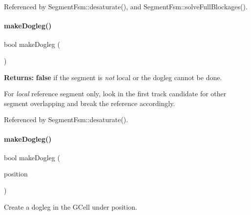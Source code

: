 Referenced by Segment\+Fsm\+::desaturate(), and Segment\+Fsm\+::solve\+Full\+Blockages().

\mbox{\label{classKite_1_1Manipulator_af4d93a43ea18ae124da71072c66d1e0a}} 
\paragraph{\texorpdfstring{make\+Dogleg()}{makeDogleg()}\hspace{0.1cm}{\footnotesize\ttfamily [1/3]}}
{\footnotesize\ttfamily bool make\+Dogleg (\begin{DoxyParamCaption}{ }\end{DoxyParamCaption})}

{\bfseries Returns\+:} {\bfseries false} if the segment is {\itshape not} local or the dogleg cannot be done.

For {\itshape local} reference segment only, look in the first track candidate for other segment overlapping and break the reference accordingly. 

Referenced by Segment\+Fsm\+::desaturate().

\mbox{\label{classKite_1_1Manipulator_a97e56b831481ef65309f6e3b7e3f4f3d}} 
\paragraph{\texorpdfstring{make\+Dogleg()}{makeDogleg()}\hspace{0.1cm}{\footnotesize\ttfamily [2/3]}}
{\footnotesize\ttfamily bool make\+Dogleg (\begin{DoxyParamCaption}\item[{\textbf{ Db\+U\+::\+Unit}}]{position }\end{DoxyParamCaption})}

Create a dogleg in the G\+Cell under {\ttfamily position}. \mbox{\label{classKite_1_1Manipulator_af7b3305693dab195d0c5d075821fbb30}} 

